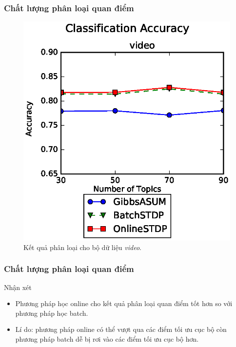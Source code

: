 \documentclass{beamer}
\begin{document}

\begin{frame}
\frametitle{Chất lượng phân loại quan điểm}
\begin{center}
\begin{figure}
\includegraphics[scale=0.5]{Image/accuracy/video.eps}
\caption*{Kết quả phân loại cho bộ dữ liệu \textit{video}.}
\end{figure}
\end{center}
\end{frame}

\begin{frame}
\frametitle{Chất lượng phân loại quan điểm}
\begin{block}{Nhận xét}
\begin{itemize}
\item Phương pháp học online cho kết quả phân loại quan điểm tốt hơn so với phương pháp học batch.
\item Lí do: phương pháp online có thể vượt qua các điểm tối ưu cục bộ còn phương pháp batch dễ bị rơi vào các điểm tối ưu cục bộ hơn.
\end{itemize}
\end{block}
\end{frame}
\end{document}
